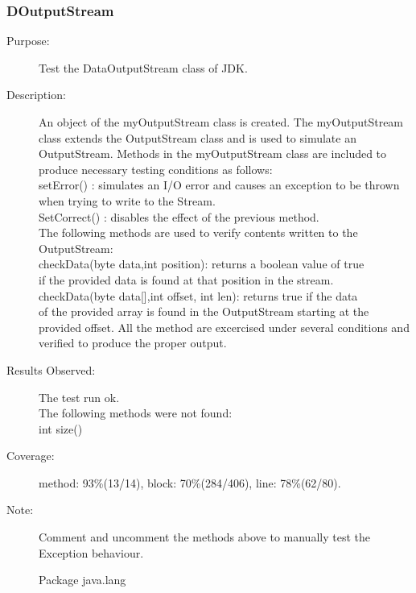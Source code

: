 \subsubsection{DOutputStream}
\begin{description}
   \item[Purpose:]
Test the DataOutputStream class of JDK.
    \item[Description:]
An object of the myOutputStream class is created. The myOutputStream
class extends the OutputStream class and is used to simulate an
OutputStream. Methods in the myOutputStream
class are included to produce necessary testing conditions as follows:\\
\textbullet setError() : simulates an I/O error
and causes an exception to be thrown when trying to write to the Stream.\\
\textbullet SetCorrect() : disables the effect of the previous method.\\
The following methods are used to verify contents written to the OutputStream:\\
\textbullet checkData(byte data,int position): returns a boolean value of true\\
if the provided data is found at that position in the stream.\\
\textbullet checkData(byte data[],int offset, int len): returns true if the data\\
of the provided array is found in the OutputStream starting at the
provided offset. All the method are excercised under several
conditions and verified to produce the proper output.
    \item[Results Observed:]
    The test run ok. \\ The following methods were not found:\\
    \textbullet int size()\\
    \item[Coverage:]
    method: 93\%(13/14), block: 70\%(284/406), line: 78\%(62/80).
    \item[Note:]
Comment and uncomment the methods above to manually test the
Exception behaviour.

\large \bf \begin{center} Package java.lang \end{center}
\end{description}

